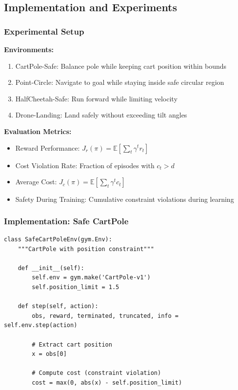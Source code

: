 \documentclass[12pt]{article}
\begin{document}
{{{{\subsection{Implementation and Experiments}

\subsubsection{Experimental Setup}

\textbf{Environments:}
\begin{enumerate}
\item CartPole-Safe: Balance pole while keeping cart position within bounds
\item Point-Circle: Navigate to goal while staying inside safe circular region
\item HalfCheetah-Safe: Run forward while limiting velocity
\item Drone-Landing: Land safely without exceeding tilt angles
\end{enumerate}

\textbf{Evaluation Metrics:}
\begin{itemize}
\item Reward Performance: $J_r(\pi) = \mathbb{E}[\sum_t \gamma^t r_t]$
\item Cost Violation Rate: Fraction of episodes with $c_t > d$
\item Average Cost: $J_c(\pi) = \mathbb{E}[\sum_t \gamma^t c_t]$
\item Safety During Training: Cumulative constraint violations during learning
\end{itemize}

\subsubsection{Implementation: Safe CartPole}

\begin{verbatim}
class SafeCartPoleEnv(gym.Env):
    """CartPole with position constraint"""
    
    def __init__(self):
        self.env = gym.make('CartPole-v1')
        self.position_limit = 1.5
    
    def step(self, action):
        obs, reward, terminated, truncated, info = self.env.step(action)
        
        # Extract cart position
        x = obs[0]
        
        # Compute cost (constraint violation)
        cost = max(0, abs(x) - self.position_limit)
        

\end{verbatim}}}}}
\end{document}
